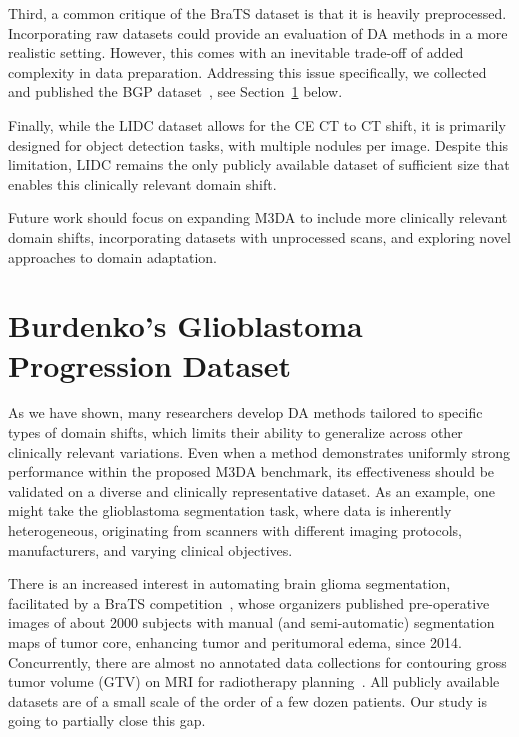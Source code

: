 Third, a common critique of the BraTS dataset is that it is heavily preprocessed. Incorporating raw datasets could provide an evaluation of DA methods in a more realistic setting. However, this comes with an inevitable trade-off of added complexity in data preparation. Addressing this issue specifically, we collected and published the BGP dataset~\cite{Zolotova2023Burdenko}, see Section~\ref{sec:da_bench:bgpd} below.


Finally, while the LIDC dataset allows for the CE CT to CT shift, it is primarily designed for object detection tasks, with multiple nodules per image. Despite this limitation, LIDC remains the only publicly available dataset of sufficient size that enables this clinically relevant domain shift.

Future work should focus on expanding M3DA to include more clinically relevant domain shifts, incorporating datasets with unprocessed scans, and exploring novel approaches to domain adaptation.


\section{Burdenko's Glioblastoma Progression Dataset}
\label{sec:da_bench:bgpd}

As we have shown, many researchers develop DA methods tailored to specific types of domain shifts, which limits their ability to generalize across other clinically relevant variations. Even when a method demonstrates uniformly strong performance within the proposed M3DA benchmark, its effectiveness should be validated on a diverse and clinically representative dataset. As an example, one might take the glioblastoma segmentation task, where data is inherently heterogeneous, originating from scanners with different imaging protocols, manufacturers, and varying clinical objectives.

There is an increased interest in automating brain glioma segmentation, facilitated by a BraTS competition~\cite{brats}, whose organizers published pre-operative images of about 2000 subjects with manual (and semi-automatic) segmentation maps of tumor core, enhancing tumor and peritumoral edema, since 2014. Concurrently, there are almost no annotated data collections for contouring gross tumor volume (GTV) on MRI for radiotherapy planning~\cite{menze2021analyzing}. All publicly available datasets are of a small scale of the order of a few dozen patients. Our study is going to partially close this gap.

